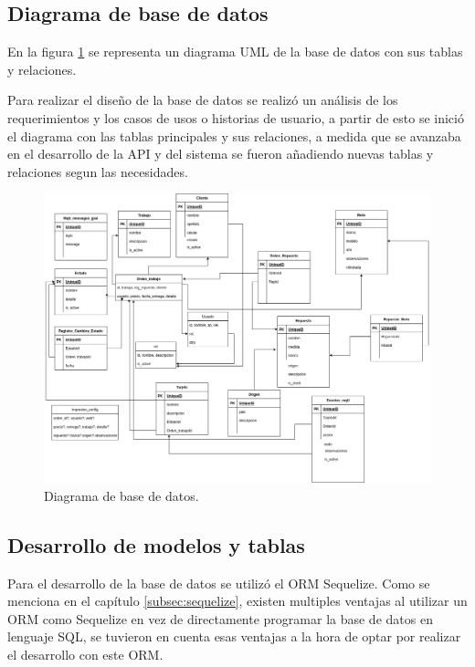 \subsection{Diagrama de base de datos}
\label{subsec:diagramabasededatos}

En la figura \ref{fig:diagramabbdd} se representa un diagrama UML de la base de datos con sus tablas y relaciones.

Para realizar el diseño de la base de datos se realizó un análisis de los requerimientos y los casos de usos o historias de usuario, a partir de esto se inició el diagrama con las tablas principales y sus relaciones, a medida que se avanzaba en el desarrollo de la API y del sistema  se fueron añadiendo nuevas tablas y relaciones segun las necesidades. 

\begin{figure}[ht]
	\centering
	\includegraphics[scale=.25]{./Figures/diagramabbdd.png}
	\caption{Diagrama de base de datos.}
	\label{fig:diagramabbdd}
\end{figure}

\subsection{Desarrollo de modelos y tablas}
\label{subsec:modelobasededatos}

Para el desarrollo de la base de datos se utilizó el ORM Sequelize. Como se menciona en el capítulo \ref{subsec:sequelize}, existen multiples ventajas al utilizar un ORM como Sequelize en vez de directamente programar la base de datos en lenguaje SQL, se tuvieron en cuenta esas ventajas a la hora de optar por realizar el desarrollo con este ORM. 

